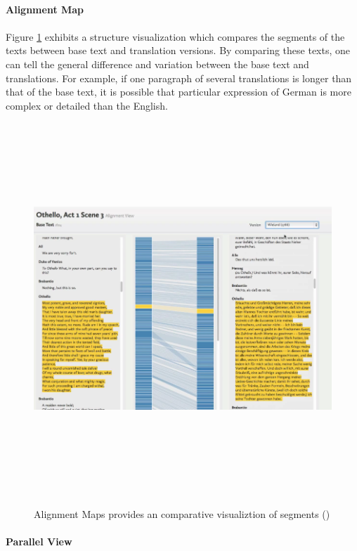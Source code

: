 \paragraph{Alignment Map}
\paragraph[]{}

Figure \ref{fig:alignmentMap} exhibits a structure visualization which compares the segments of the texts between base text and translation versions. By comparing these texts, one can tell the general difference and variation between the base text and translations. For example, if one paragraph of several translations is longer than that of the base text, it is possible that particular expression of German is more complex or detailed than the English. 

\begin{figure}[h] 
	\centering	
	\includegraphics[width=16cm, height=14cm]{Figs/Alignment-Map}\\[1ex]
	\caption{Alignment Maps provides an comparative visualiztion of segments (\cite{Cheesman2012})}
	\label{fig:alignmentMap}
\end{figure} 

\paragraph{Parallel View}
